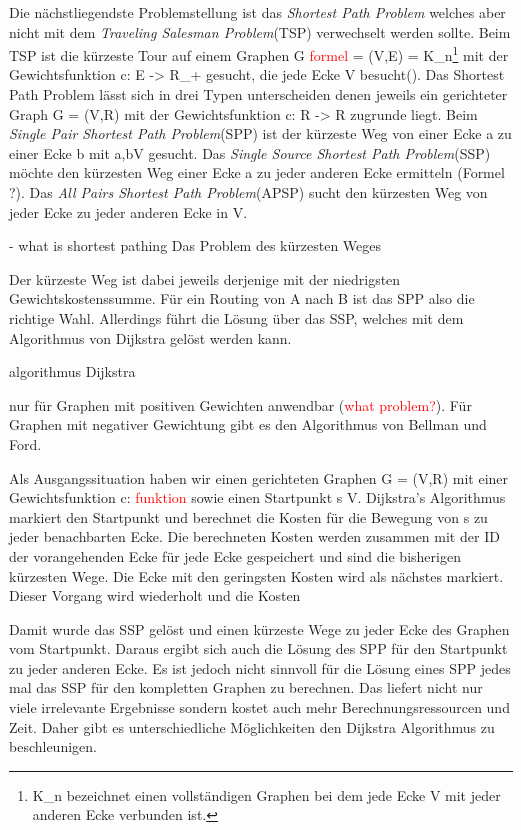 \documentclass[10pt,a4paper]{article}
\newcommand\todo[1]{\textcolor{red}{#1}}
\begin{document}
Die nächstliegendste Problemstellung ist das \textit{Shortest Path Problem} welches aber nicht mit dem \textit{Traveling Salesman Problem}(TSP) verwechselt werden sollte. Beim TSP ist die kürzeste Tour auf einem Graphen G \todo{formel} = (V,E) = K_{n}\footnote{K_{n} bezeichnet einen vollständigen Graphen bei dem jede Ecke V mit jeder anderen Ecke verbunden ist.} mit der Gewichtsfunktion c: E -> R_{+} gesucht, die jede Ecke V besucht(\cite[135]{algorithms}).
Das Shortest Path Problem lässt sich in drei Typen unterscheiden denen jeweils ein gerichteter Graph G = (V,R) mit der Gewichtsfunktion c: R -> R zugrunde liegt. Beim \textit{Single Pair Shortest Path Problem}(SPP) ist der kürzeste Weg von einer Ecke a zu einer Ecke b mit a,b\in V gesucht. Das \textit{Single Source Shortest Path Problem}(SSP) möchte den kürzesten Weg einer Ecke a zu jeder anderen Ecke ermitteln (Formel ?). Das \textit{All Pairs Shortest Path Problem}(APSP) sucht den kürzesten Weg von jeder Ecke zu jeder anderen Ecke in V. \cite[169f]{algorithms}

- what is shortest pathing
Das Problem des kürzesten Weges 
\cite[191]{kurt}

Der kürzeste Weg ist dabei jeweils derjenige mit der niedrigsten Gewichtskostenssumme.
Für ein Routing von A nach B ist das SPP also die richtige Wahl. Allerdings führt die Lösung über das SSP, welches mit dem Algorithmus von Dijkstra gelöst werden kann.


algorithmus Dijkstra 

nur für Graphen mit positiven Gewichten anwendbar (\todo{what problem?}). Für Graphen mit negativer Gewichtung gibt es den Algorithmus von Bellman und Ford.


\cite{dijkstra}
Als Ausgangssituation haben wir einen gerichteten Graphen G = (V,R) mit einer Gewichtsfunktion c: \todo{funktion} sowie einen Startpunkt s \in V. Dijkstra's Algorithmus markiert den Startpunkt und berechnet die Kosten für die Bewegung von s zu jeder benachbarten Ecke. Die berechneten Kosten werden zusammen mit der ID der vorangehenden Ecke für jede Ecke gespeichert und sind die bisherigen kürzesten Wege. Die Ecke mit den geringsten Kosten wird als nächstes markiert. Dieser Vorgang wird wiederholt und die Kosten 


Damit wurde das SSP gelöst und einen kürzeste Wege zu jeder Ecke des Graphen vom Startpunkt. Daraus ergibt sich auch die Lösung des SPP für den Startpunkt zu jeder anderen Ecke. Es ist jedoch nicht sinnvoll für die Lösung eines SPP jedes mal das SSP für den kompletten Graphen zu berechnen. Das liefert nicht nur viele irrelevante Ergebnisse sondern kostet auch mehr Berechnungsressourcen und Zeit. Daher gibt es unterschiedliche Möglichkeiten den Dijkstra Algorithmus zu beschleunigen.
\end{document}
